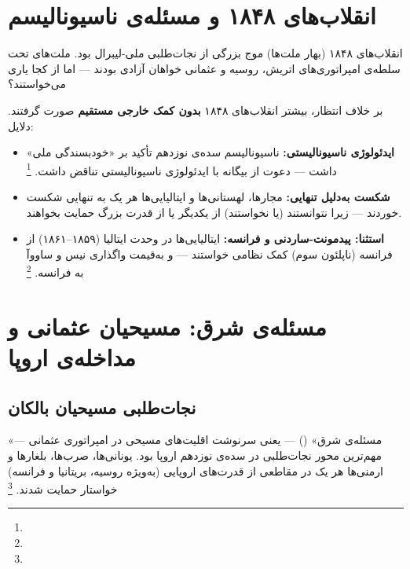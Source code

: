 \section{انقلاب‌های ۱۸۴۸ و مسئله‌ی ناسیونالیسم}
\label{sec:ch08-1848}

انقلاب‌های ۱۸۴۸ (بهار ملت‌ها) موج بزرگی از نجات‌طلبی ملی-لیبرال بود. ملت‌های تحت سلطه‌ی امپراتوری‌های اتریش، روسیه و عثمانی خواهان آزادی بودند — اما از کجا یاری می‌خواستند؟

\begin{tcolorbox}[defbox, title={پارادوکس ۱۸۴۸: ناسیونالیسم بدون ناجی خارجی}]
بر خلاف انتظار، بیشتر انقلاب‌های ۱۸۴۸ \textbf{بدون کمک خارجی مستقیم} صورت گرفتند. دلایل:
\begin{itemize}[nosep, rightmargin=1em]
  \item \textbf{ایدئولوژی ناسیونالیستی:} ناسیونالیسم سده‌ی نوزدهم تأکید بر «خودبسندگی ملی» داشت — دعوت از بیگانه با ایدئولوژی ناسیونالیستی تناقض داشت.%
  \footnote{}
  \item \textbf{شکست به‌دلیل تنهایی:} مجارها، لهستانی‌ها و ایتالیایی‌ها هر یک به تنهایی شکست خوردند — زیرا نتوانستند (یا نخواستند) از یکدیگر یا از قدرت بزرگ حمایت بخواهند.
  \item \textbf{استثنا: پیدمونت-ساردنی و فرانسه:} ایتالیایی‌ها در وحدت ایتالیا (۱۸۵۹–۱۸۶۱) از فرانسه (ناپلئون سوم) کمک نظامی خواستند — و به‌قیمت واگذاری نیس و ساووآ به فرانسه.%
  \footnote{}
\end{itemize}
\end{tcolorbox}

\section{مسئله‌ی شرق: مسیحیان عثمانی و مداخله‌ی اروپا}
\label{sec:ch08-eastern-question}

\subsection{نجات‌طلبی مسیحیان بالکان}

«مسئله‌ی شرق» () — یعنی سرنوشت اقلیت‌های مسیحی در امپراتوری عثمانی — مهم‌ترین محور نجات‌طلبی در سده‌ی نوزدهم اروپا بود. یونانی‌ها، صرب‌ها، بلغارها و ارمنی‌ها هر یک در مقاطعی از قدرت‌های اروپایی (به‌ویژه روسیه، بریتانیا و فرانسه) خواستار حمایت شدند.%
\footnote{}

